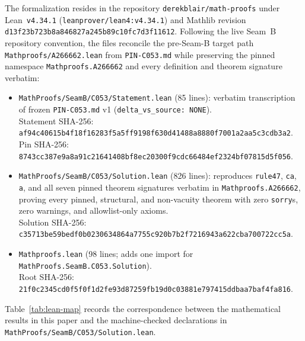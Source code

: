 \documentclass[11pt]{article}
\theoremstyle{definition}
\begin{document}
The formalization resides in the repository \texttt{derekblair/math-proofs} under Lean~\texttt{v4.34.1} (\nolinkurl{leanprover/lean4:v4.34.1}) and Mathlib revision {\small\nolinkurl{d13f23b723b8a846827a245b89c10fc7d3f11612}}. Following the live Seam~B repository convention, the files reconcile the pre-Seam-B target path \nolinkurl{Mathproofs/A266662.lean} from \texttt{PIN-C053.md} while preserving the pinned namespace \nolinkurl{Mathproofs.A266662} and every definition and theorem signature verbatim:
\begin{itemize}\setlength{\itemsep}{2pt}
\item \nolinkurl{MathProofs/SeamB/C053/Statement.lean} (85 lines): verbatim transcription of frozen \texttt{PIN-C053.md} v1 (\texttt{delta\_vs\_source: NONE}).\\
Statement SHA-256: {\small\nolinkurl{af94c40615b4f18f16283f5a5ff9198f630d41488a8880f7001a2aa5c3cdb3a2}}.\\
Pin SHA-256: {\small\nolinkurl{8743cc387e9a8a91c21641408bf8ec20300f9cdc66484ef2324bf07815d5f056}}.
\item \nolinkurl{MathProofs/SeamB/C053/Solution.lean} (826 lines): reproduces \texttt{rule47}, \texttt{ca}, \texttt{a}, and all seven pinned theorem signatures verbatim in \nolinkurl{Mathproofs.A266662}, proving every pinned, structural, and non-vacuity theorem with zero \texttt{sorry}s, zero warnings, and allowlist-only axioms.\\
Solution SHA-256: {\small\nolinkurl{c35713be59bedf0b0230634864a7755c920b7b2f7216943a622cba700722cc5a}}.
\item \nolinkurl{Mathproofs.lean} (98 lines; adds one import for \nolinkurl{MathProofs.SeamB.C053.Solution}).\\
Root SHA-256: {\small\nolinkurl{21f0c2345cd0f5f0f1d2fe93d87259fb19d0c03881e797415ddbaa7baf4fa816}}.
\end{itemize}

Table~\ref{tab:lean-map} records the correspondence between the mathematical results in this paper and the machine-checked declarations in \nolinkurl{MathProofs/SeamB/C053/Solution.lean}.
\end{document}
